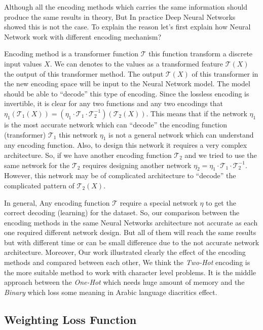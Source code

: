 Although all the encoding methods which carries the same information should produce the same results in theory, But In practice Deep Neural Networks showed this is not the case. To explain the reason let's first explain how Neural Network work with different encoding mechanism?

Encoding method is a transformer function $\mathcal{T}$ this function transform a discrete input values $X$. We can denotes to the values as a transformed feature $\mathcal{T}(X)$ the output of this transformer method. The output $\mathcal{T}(X)$ of this transformer in the new encoding space will be input to the Neural Network model. The model should be able to ``decode''  this type of encoding. Since the lossless encoding is invertible, it is clear for any two functions and any two encodings that $\eta_1\left(\mathcal{T}_1(X)\right) = \left(\eta_1\cdot\mathcal{T}_1\cdot \mathcal{T}_2^{-1} \right)\left(\mathcal{T}_2(X)\right)$. This means that if the network $\eta_1$ is the most accurate network which can ``decode'' the encoding function (transformer) $\mathcal{T}_1$ this network $\eta_1$ is not a general network which can understand any encoding function. Also, to design this network it requires a very complex architecture. So, if we have another encoding function $\mathcal{T}_2$ and we tried to use the same network for the $\mathcal{T}_2$ requires designing another network $\eta_2 = \eta_1\cdot\mathcal{T}_1\cdot \mathcal{T}_2^{-1}$. However, this network may be of complicated architecture to ``decode'' the complicated pattern of $\mathcal{T}_2(X)$.

In general, Any encoding function $\mathcal{T}$ require a special network $\eta$ to get the correct decoding (learning) for the dataset. So, our comparison between the encoding methods in the same Neural Networks architecture not accurate as each one required different network design. But all of them will reach the same results but with different time or can be small difference due to the not accurate network architecture. Moreover, Our work illustrated clearly the effect of the encoding methods and compared between each other, We think the \textit{Two-Hot} encoding is the more suitable method to work with character level problems. It is the middle approach between the \textit{One-Hot} which needs huge amount of memory and the \textit{Binary} which loss some meaning in Arabic language diacritics effect.


\subsection{Weighting Loss Function}

